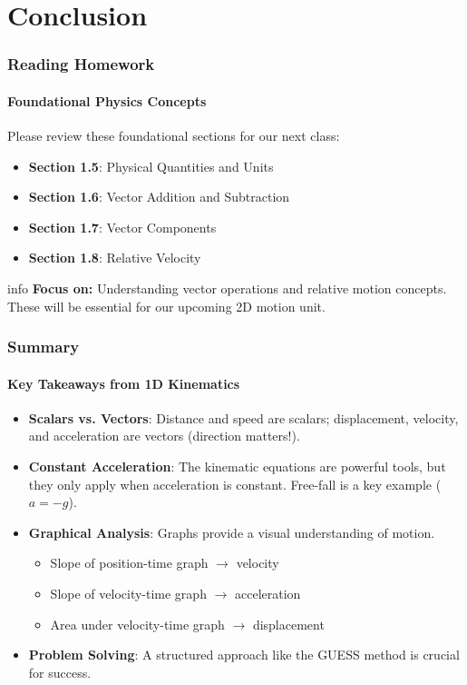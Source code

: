 \documentclass{beamer}
\begin{document}
\section{Conclusion}

\begin{frame}
\frametitle{Reading Homework}
\framesubtitle{Foundational Physics Concepts}
Please review these foundational sections for our next class:

\begin{itemize}
    \item \textbf{Section 1.5}: Physical Quantities and Units
    \item \textbf{Section 1.6}: Vector Addition and Subtraction
    \item \textbf{Section 1.7}: Vector Components
    \item \textbf{Section 1.8}: Relative Velocity
\end{itemize}

\begin{beamercolorbox}[rounded=true,shadow=true]{info}
\centering
\textbf{Focus on:} Understanding vector operations and relative motion concepts. These will be essential for our upcoming 2D motion unit.
\end{beamercolorbox}
\end{frame}

\begin{frame}
\frametitle{Summary}
\framesubtitle{Key Takeaways from 1D Kinematics}
\begin{itemize}
    \item \textbf{Scalars vs. Vectors}: Distance and speed are scalars; displacement, velocity, and acceleration are vectors (direction matters!).
    \pause
    \item \textbf{Constant Acceleration}: The kinematic equations are powerful tools, but they only apply when acceleration is constant. Free-fall is a key example ($a = -g$).
    \pause
    \item \textbf{Graphical Analysis}: Graphs provide a visual understanding of motion.
    \begin{itemize}
        \item Slope of position-time graph $\rightarrow$ velocity
        \item Slope of velocity-time graph $\rightarrow$ acceleration
        \item Area under velocity-time graph $\rightarrow$ displacement
    \end{itemize}
    \pause
    \item \textbf{Problem Solving}: A structured approach like the GUESS method is crucial for success.
\end{itemize}
\end{frame}
\end{document}
